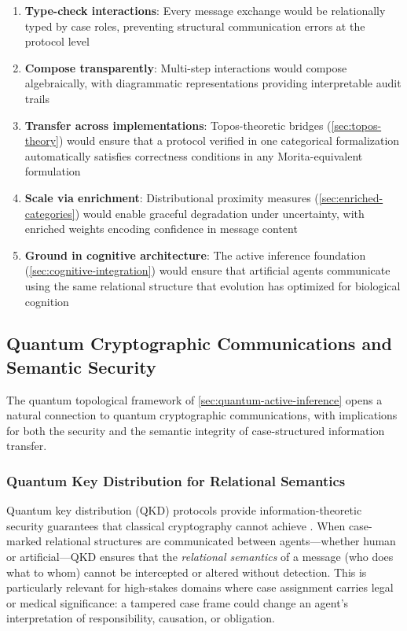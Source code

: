 \documentclass[
]{article}
\providecommand{\tightlist}{%
  \setlength{\itemsep}{0pt}\setlength{\parskip}{0pt}}
\numberwithin{equation}{section}
\begin{document}
\begin{enumerate}
\def\labelenumi{\arabic{enumi}.}
\tightlist
\item
  \textbf{Type-check interactions}: Every message exchange would be
  relationally typed by case roles, preventing structural communication
  errors at the protocol level
\item
  \textbf{Compose transparently}: Multi-step interactions would compose
  algebraically, with diagrammatic representations providing
  interpretable audit trails
\item
  \textbf{Transfer across implementations}: Topos-theoretic bridges
  (\autoref{sec:topos-theory}) would ensure that a protocol verified in
  one categorical formalization automatically satisfies correctness
  conditions in any Morita-equivalent formulation
\item
  \textbf{Scale via enrichment}: Distributional proximity measures
  (\autoref{sec:enriched-categories}) would enable graceful degradation
  under uncertainty, with enriched weights encoding confidence in
  message content
\item
  \textbf{Ground in cognitive architecture}: The active inference
  foundation (\autoref{sec:cognitive-integration}) would ensure that
  artificial agents communicate using the same relational structure that
  evolution has optimized for biological cognition
\end{enumerate}

\subsection{Quantum Cryptographic Communications and Semantic
Security}\label{quantum-cryptographic-communications-and-semantic-security}

The quantum topological framework of
\autoref{sec:quantum-active-inference} opens a natural connection to
quantum cryptographic communications, with implications for both the
security and the semantic integrity of case-structured information
transfer.

\subsubsection{Quantum Key Distribution for Relational
Semantics}\label{quantum-key-distribution-for-relational-semantics}

Quantum key distribution (QKD) protocols provide information-theoretic
security guarantees that classical cryptography cannot achieve
\citep{pirandola2020qkd}. When case-marked relational structures are
communicated between agents---whether human or artificial---QKD ensures
that the \emph{relational semantics} of a message (who does what to
whom) cannot be intercepted or altered without detection. This is
particularly relevant for high-stakes domains where case assignment
carries legal or medical significance: a tampered case frame could
change an agent's interpretation of responsibility, causation, or
obligation.
\end{document}
